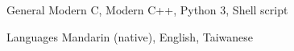 

\begin{cvskills}

    \cvskill
    {General} %
    {Modern C, Modern C++, Python 3, Shell script} %

    \cvskill
    {Languages} %
    {Mandarin (native), English, Taiwanese} %

\end{cvskills}
